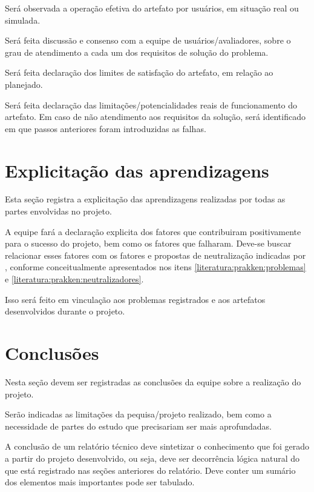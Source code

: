 \documentclass[12pt]{article}
\begin{document}
	Será observada a operação efetiva do artefato por usuários, em situação real ou simulada.

	Será feita discussão e consenso com a equipe de usuários/avaliadores, sobre o grau de atendimento a cada um dos requisitos de solução do problema.

	Será feita declaração dos limites de satisfação do artefato, em relação ao planejado.

	Será feita declaração das limitações/potencialidades reais de funcionamento do artefato.
	Em caso de não atendimento aos requisitos da solução, será identificado em que passos anteriores foram introduzidas as falhas.
	
	\section{Explicitação das aprendizagens\label{Sec:CP:ExplicitAprendizagens}}
	
	Esta seção registra a explicitação das aprendizagens realizadas por todas as partes envolvidas no projeto.
	
	A equipe fará a declaração explicita dos fatores que contribuiram positivamente para o sucesso do projeto, bem como os fatores que falharam. Deve-se buscar relacionar esses fatores com os fatores e propostas de neutralização indicadas por \cite{prakken_information_2000}, conforme conceitualmente apresentados nos itens \ref{literatura:prakken:problemas} e \ref{literatura:prakken:neutralizadores}.
	
	Isso será feito em vinculação aos problemas registrados e aos artefatos desenvolvidos durante o projeto.
	
	\section{Conclusões\label{Sec:CP:Conclusoes}}
	
	Nesta seção devem ser registradas as conclusões da equipe sobre a realização do projeto.
	
	Serão indicadas as limitações da pequisa/projeto realizado, bem como a necessidade de partes do estudo que precisariam ser mais aprofundadas.
	
	A conclusão de um relatório técnico deve sintetizar o conhecimento que foi gerado a partir do projeto desenvolvido, ou seja, deve ser decorrência lógica natural do que está registrado nas seções anteriores do relatório. Deve conter um sumário dos elementos mais importantes pode ser tabulado.
	
\end{document}
